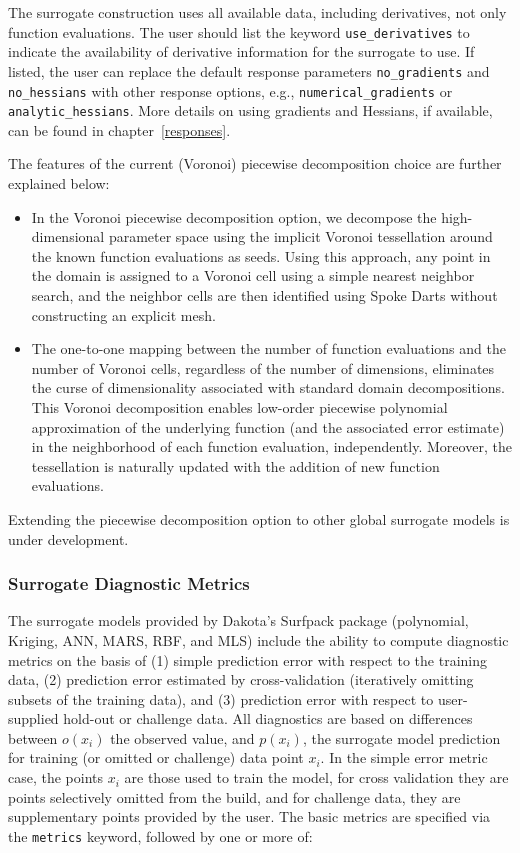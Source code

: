 The surrogate construction uses all available data, including derivatives, not only function evaluations. The user should list the keyword \texttt{use\_derivatives} to indicate the availability of derivative information for the surrogate to use. If listed, the user can replace the default response parameters \texttt{no\_gradients} and \texttt{no\_hessians} with other response options, e.g., \texttt{numerical\_gradients} or \texttt{analytic\_hessians}. More details on using gradients and Hessians, if available, can be found in chapter~\ref{responses}. 

The features of the current (Voronoi) piecewise decomposition choice are further explained below: 

\begin{itemize}
	\item In the Voronoi piecewise decomposition option, we decompose the high-dimensional parameter space using the implicit Voronoi tessellation around the known function evaluations as seeds. Using this approach, any point in the domain is assigned to a Voronoi cell using a simple nearest neighbor search, and the neighbor cells are then identified using Spoke Darts without constructing an explicit mesh. 
	\item The one-to-one mapping between the number of function evaluations and the number of Voronoi cells, regardless of the number of dimensions, eliminates the curse of dimensionality associated with standard domain decompositions. This Voronoi decomposition enables low-order piecewise polynomial approximation of the underlying function (and the associated error estimate) in the neighborhood of each function evaluation, independently. Moreover, the tessellation is naturally updated with the addition of new function evaluations.  
\end{itemize}

Extending the piecewise decomposition option to other global surrogate models is under development. 

\subsubsection{Surrogate Diagnostic Metrics}\label{models:surf:diagnostics}

The surrogate models provided by Dakota's Surfpack package
(polynomial, Kriging, ANN, MARS, RBF, and MLS) include the ability to
compute diagnostic metrics on the basis of (1) simple prediction error
with respect to the training data, (2) prediction error estimated by
cross-validation (iteratively omitting subsets of the training data),
and (3) prediction error with respect to user-supplied hold-out or
challenge data.  All diagnostics are based on differences between
$o(x_i)$ the observed value, and $p(x_i)$, the surrogate model
prediction for training (or omitted or challenge) data point $x_i$.
In the simple error metric case, the points $x_i$ are those used to
train the model, for cross validation they are points selectively
omitted from the build, and for challenge data, they are supplementary
points provided by the user.  The basic metrics are specified via the
{\tt metrics} keyword, followed by one or more of:


